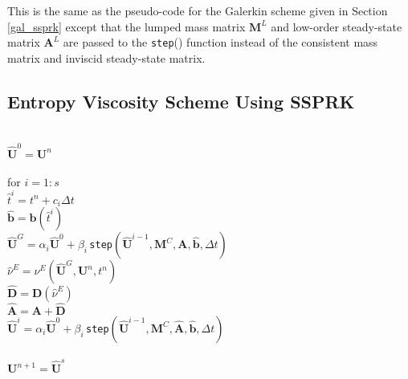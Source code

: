 This is the same as the pseudo-code for the Galerkin scheme
given in Section \ref{gal_ssprk} except that the lumped
mass matrix $\mathbf{M}^L$ and low-order steady-state
matrix $\mathbf{A}^L$ are passed to the \texttt{step}()
function instead of the consistent mass matrix and
inviscid steady-state matrix.
\subsection{Entropy Viscosity Scheme Using SSPRK}

{\noindent\\
$\hat{\mathbf{U}}^0 = \mathbf{U}^n$\\
\\
for $i=1:s$\\
\tab $\hat{t}^i = t^n+c_i\Delta t$\\
\tab $\hat{\mathbf{b}} = \mathbf{b}(\hat{t}^i)$\\
\tab $\hat{\mathbf{U}}^G = \alpha_i\hat{\mathbf{U}}^0
   + \beta_i\,$\texttt{step}$(\hat{\mathbf{U}}^{i-1},\mathbf{M}^C,
   \mathbf{A},\hat{\mathbf{b}},\Delta t)$\\
\tab $\hat{\nu}^E = \nu^E(\hat{\mathbf{U}}^G,\mathbf{U}^n,t^n)$\\
\tab $\hat{\mathbf{D}} = \mathbf{D}(\hat{\nu}^E)$\\
\tab $\hat{\mathbf{A}} = \mathbf{A} + \hat{\mathbf{D}}$\\
\tab $\hat{\mathbf{U}}^i = \alpha_i\hat{\mathbf{U}}^0
   + \beta_i\,$\texttt{step}$(\hat{\mathbf{U}}^{i-1},\mathbf{M}^C,
   \hat{\mathbf{A}},\hat{\mathbf{b}},\Delta t)$\\
\\
$\mathbf{U}^{n+1} = \hat{\mathbf{U}}^s$\\
}

